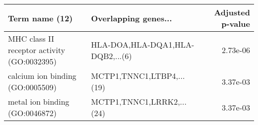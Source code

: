 \begin{tabular}{llr}
\toprule
                             Term name (12) &             Overlapping genes... &  Adjusted p-value \\
\midrule
MHC class II receptor activity (GO:0032395) & HLA-DOA,HLA-DQA1,HLA-DQB2,...(6) &          2.73e-06 \\
           calcium ion binding (GO:0005509) &        MCTP1,TNNC1,LTBP4,...(19) &          3.37e-03 \\
             metal ion binding (GO:0046872) &        MCTP1,TNNC1,LRRK2,...(24) &          3.37e-03 \\
\bottomrule
\end{tabular}
